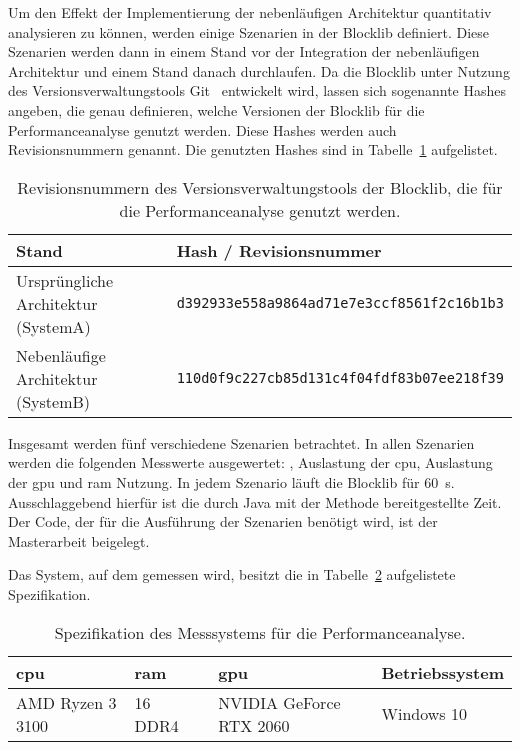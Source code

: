 Um den Effekt der Implementierung der nebenläufigen Architektur quantitativ analysieren zu können, werden einige Szenarien in der Blocklib definiert. Diese Szenarien werden dann in einem Stand vor der Integration der nebenläufigen Architektur und einem Stand danach durchlaufen. Da die Blocklib unter Nutzung des Versionsverwaltungstools Git~\cite{Chacon2014} entwickelt wird, lassen sich sogenannte Hashes angeben, die genau definieren, welche Versionen der Blocklib für die Performanceanalyse genutzt werden. Diese Hashes werden auch Revisionsnummern genannt. Die genutzten Hashes sind in Tabelle~\ref{tab:perfHash} aufgelistet.
\begin{table}[!htbp]
	\centering
	\begin{tabular}{ll}
		\toprule
		Stand & Hash / Revisionsnummer \\
		\midrule
		Ursprüngliche Architektur (SystemA) & \texttt{d392933e558a9864ad71e7e3ccf8561f2c16b1b3} \\
		Nebenläufige Architektur (SystemB)& \texttt{110d0f9c227cb85d131c4f04fdf83b07ee218f39}\\
		\bottomrule
	\end{tabular}
	\caption{Revisionsnummern des Versionsverwaltungstools der Blocklib, die für die Performanceanalyse genutzt werden.}\label{tab:perfHash}
\end{table}

Insgesamt werden fünf verschiedene Szenarien betrachtet. In allen Szenarien werden die folgenden Messwerte ausgewertet: \si{\fps}, Auslastung der \acs{cpu}, Auslastung der \ac{gpu} und \ac{ram} Nutzung. In jedem Szenario läuft die Blocklib für \SI{60}{\second}. Ausschlaggebend hierfür ist die durch Java mit der Methode  bereitgestellte Zeit. Der Code, der für die Ausführung der Szenarien benötigt wird, ist der Masterarbeit beigelegt.

Das System, auf dem gemessen wird, besitzt die in Tabelle~\ref{tab:spec} aufgelistete Spezifikation.

\begin{table}[!h]
	\centering
	\begin{tabular}[]{llll}
		\ac{cpu} & \ac{ram} & \ac{gpu} & Betriebssystem\\
		\midrule
		AMD Ryzen 3 3100 & \SI{16}{\giga\byte} DDR4 & NVIDIA GeForce RTX 2060 & Windows 10
	\end{tabular}
	\caption{Spezifikation des Messsystems für die Performanceanalyse.}\label{tab:spec}
\end{table}


